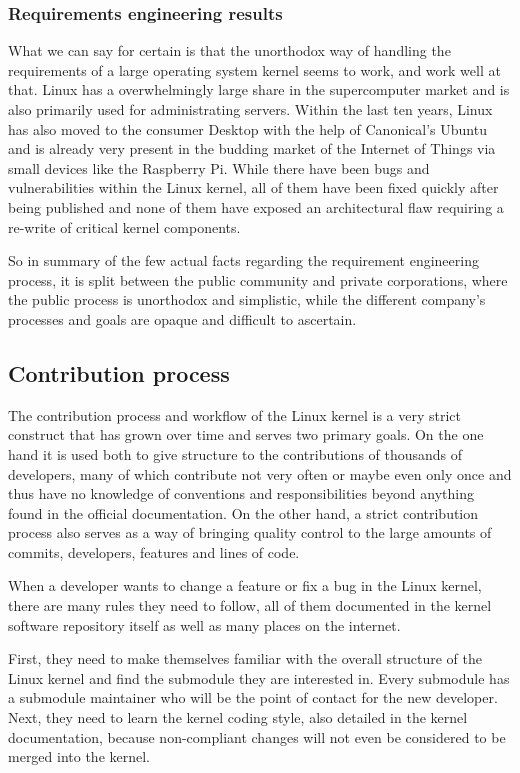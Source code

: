 \documentclass{sig-alternate-05-2015}
\begin{document}
\subsubsection{Requirements engineering results}

What we can say for certain is that the unorthodox way of handling the requirements of a large operating system kernel seems to work, and work well at that.
Linux has a overwhelmingly large share in the supercomputer market and is also primarily used for administrating servers.
Within the last ten years, Linux has also moved to the consumer Desktop with the help of Canonical's Ubuntu and is already very present in the budding market of the Internet of Things via small devices like the Raspberry Pi.
While there have been bugs and vulnerabilities within the Linux kernel, all of them have been fixed quickly after being published and none of them have exposed an architectural flaw requiring a re-write of critical kernel components.

So in summary of the few actual facts regarding the requirement engineering process, it is split between the public community and private corporations, where the public process is unorthodox and simplistic, while the different company's processes and goals are opaque and difficult to ascertain.

\subsection{Contribution process}

The contribution process and workflow of the Linux kernel is a very strict construct that has grown over time and serves two primary goals.
On the one hand it is used both to give structure to the contributions of thousands of developers, many of which contribute not very often or maybe even only once and thus have no knowledge of conventions and responsibilities beyond anything found in the official documentation.
On the other hand, a strict contribution process also serves as a way of bringing quality control to the large amounts of commits, developers, features and lines of code.

When a developer wants to change a feature or fix a bug in the Linux kernel, there are many rules they need to follow, all of them documented in the kernel software repository itself as well as many places on the internet.

First, they need to make themselves familiar with the overall structure of the Linux kernel and find the submodule they are interested in.
Every submodule has a submodule maintainer who will be the point of contact for the new developer.
Next, they need to learn the kernel coding style, also detailed in the kernel documentation, because non-compliant changes will not even be considered to be merged into the kernel.
\end{document}
